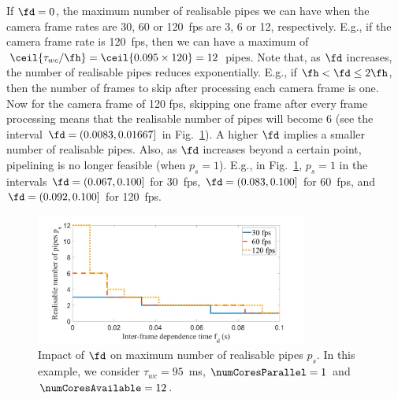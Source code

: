 If $\fd=0$, the maximum number of realisable pipes we can have when the camera frame rates are 30, 60 or 120~fps are 3, 6 or 12, respectively.
E.g., if the camera frame rate is 120~fps, then we can have a maximum of $\ceil{\tau_{wc}/\fh}=\ceil{0.095\times 120}=12$ pipes.
Note that, as $\fd$ increases, the number of realisable pipes reduces exponentially.
E.g., if $\fh < \fd \le 2\fh$, then the number of frames to skip after processing each camera frame is one. Now for the camera frame of 120 fps, skipping one frame after every frame processing means that the realisable number of pipes will become 6 (see the interval $\fd=(0.0083,0.01667]$ in Fig.~\ref{fig:ch7_fd_vs_ps}).
A higher $\fd$ implies a smaller number of realisable pipes. 
Also, as $\fd$ increases beyond a certain point, pipelining is no longer feasible (when $p_s=1$). 
E.g., in Fig.~\ref{fig:ch7_fd_vs_ps}, $p_s=1$ in the intervals $\fd=(0.067,0.100]$ for 30~fps, $\fd=(0.083,0.100]$ for 60~fps, and $\fd=(0.092,0.100]$ for 120~fps.

\begin{figure}[ht]
\centerline{
    \includegraphics[width=0.8\textwidth]{images/fd_vs_ps2.jpg}
    }
    \caption{Impact of $\fd$ on maximum number of realisable pipes $p_s$. In this example, we consider $\tau_{wc}=95$~ms, $\numCoresParallel=1$ and $\numCoresAvailable=12$.}
    \label{fig:ch7_fd_vs_ps}
    \vspace{-2em}
\end{figure}

